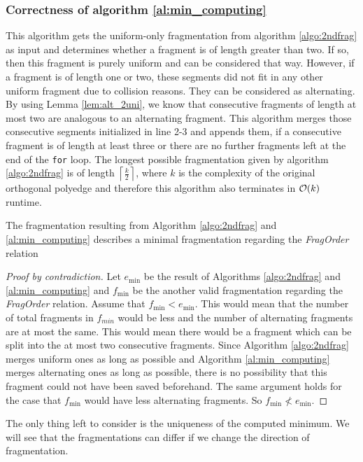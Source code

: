 \subsubsection*{Correctness of algorithm \ref{al:min_computing}}
This algorithm gets the uniform-only fragmentation from algorithm \ref{algo:2ndfrag} as input and determines whether a fragment is of length greater than two. If so, then this fragment is purely uniform and can be considered that way. However, if a fragment is of length one or two, these segments did not fit in any other uniform fragment due to collision reasons. They can be considered as alternating. By using Lemma \ref{lem:alt_2uni}, we know that consecutive fragments of length at most two are analogous to an alternating fragment. This algorithm merges those consecutive segments initialized in line 2-3 and appends them, if a consecutive fragment is of length at least three or there are no further fragments left at the end of the \texttt{for} loop. The longest possible fragmentation given by algorithm \ref{algo:2ndfrag} is of length $\left\lceil\frac{k}{2}\right\rceil$, where $k$ is the complexity of the original orthogonal polyedge and therefore this algorithm also terminates in $\mathcal{O}(k)$ runtime.
\begin{theorem}
	The fragmentation resulting from Algorithm \ref{algo:2ndfrag} and \ref{al:min_computing} describes a minimal fragmentation regarding the \textit{FragOrder} relation\label{th:frag_min}
\end{theorem}
\begin{proof}[Proof by contradiction]
	Let $e_{\min}$ be the result of Algorithms \ref{algo:2ndfrag} and \ref{al:min_computing} and $f_{\min}$ be the another valid fragmentation regarding the \textit{FragOrder} relation. Assume that $f_{\min} < e_{\min}$. This would mean that the number of total fragments in $f_{min}$ would be less and the number of alternating fragments are at most the same. This would mean there would be a fragment which can be split into the at most two consecutive fragments. Since Algorithm \ref{algo:2ndfrag} merges uniform ones as long as possible and Algorithm \ref{al:min_computing} merges alternating ones as long as possible, there is no possibility that this fragment could not have been saved beforehand. The same argument holds for the case that $f_{\min}$ would have less alternating fragments. So $f_{\min} \nless e_{\min}$.
\end{proof}
The only thing left to consider is the uniqueness of the computed minimum. We will see that the fragmentations can differ if we change the direction of fragmentation.
